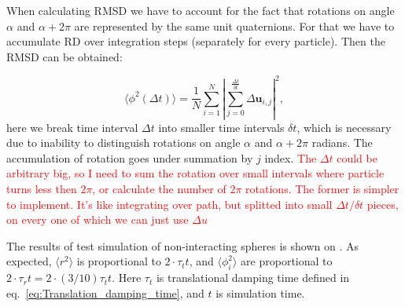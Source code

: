 When calculating RMSD we have to account for the fact that rotations on angle $
\alpha$ and $\alpha + 2\pi$ are represented by the same unit quaternions. For that we have to accumulate RD over integration steps (separately for every particle). Then the RMSD can be obtained:

\begin{equation}
\label{eq:rotational_mean_square_displacement}
	\langle \phi^2 (\Delta t)\rangle
		= \frac{1}{N} \sum_{i=1}^{N} 
			\left|
				\sum_{j = 0}^{\frac{\Delta t}{\delta t}}
					\Delta\boldsymbol{u}_{i,j}
			\right|^2
	,
\end{equation}
here we break time interval $\Delta t$ into smaller time intervals $\delta t$, which is necessary due to inability to distinguish rotations on angle $\alpha$ and $\alpha + 2\pi$ radians. The accumulation of rotation goes under summation by $j$ index. \textcolor{red}{The $\Delta t$ could be arbitrary big, so I need to sum the rotation over small intervals where particle turns less then $2 \pi$, or calculate the number of $2 \pi$ rotations. The former is simpler to implement. It's like integrating over path, but splitted into small $\Delta t / \delta t$ pieces, on every one of which we can just use $\Delta u$}

The results of test simulation of non-interacting spheres is shown on . As expected, $\langle r^2\rangle$ is proportional to $2 \cdot \tau_t t$, and $\langle \phi_i^2\rangle$ are proportional to $2 \cdot \tau_r t = 2 \cdot (3/10) \tau_t t$. Here $\tau_t$ is translational damping time defined in eq.~\eqref{eq:Translation_damping_time}, and $t$ is simulation time.

